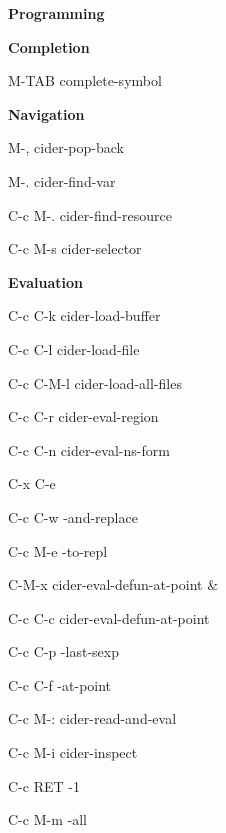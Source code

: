 \documentclass[a4paper,10pt]{article}
\renewcommand\section[1]{\bigskip\par\textbf{\large#1}\medskip}
\renewcommand\subsection[1]{\medskip\par\textbf{#1}\medskip}
\newcommand\keyify[1]{\keys{\ttfamily#1}}
\begin{document}
\begin{multicols}{2}

\section{Programming}
\subsection{Completion}

\begin{keylist}[labelwidth=\widthof{\keyify{C-c C-c}}]
  \item[M-TAB] complete-symbol
\end{keylist}

\subsection{Navigation}
\begin{keylist}[labelwidth=\widthof{\keyify{C-c M-.}}]
  \item[M-,] cider-pop-back
  \item[M-.] cider-find-var
  \item[C-c M-.] cider-find-resource
  \item[C-c M-s] cider-selector
\end{keylist}

\subsection{Evaluation}
\begin{keylist}[labelwidth=\widthof{\keyify{C-c RET}}]
  \item[C-c C-k] cider-load-buffer
  \item[C-c C-l] cider-load-file
  \item[C-c C-M-l] cider-load-all-files
  \item[C-c C-r] cider-eval-region
  \item[C-c C-n] cider-eval-ns-form
  \item[C-x C-e] 
  \item[C-c C-w] \ns                     -and-replace
  \item[C-c M-e] \ns                     -to-repl
  \item[C-M-x]   cider-eval-defun-at-point
\&\item[C-c C-c] cider-eval-defun-at-point
  \item[C-c C-p] -last-sexp
  \item[C-c C-f] \ns                   -at-point
  \item[C-c M-:] cider-read-and-eval
  \item[C-c M-i] cider-inspect
  \item[C-c RET] -1
  \item[C-c M-m] \ns                   -all
\end{keylist}


\end{multicols}
\end{document}

